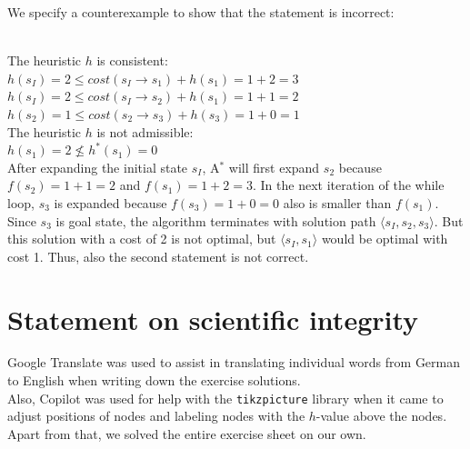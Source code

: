 \documentclass{article} %
\begin{document}
\begin{enumerate}[(a)]
    We specify a counterexample to show that the statement is incorrect:\\
    \\[0.7em]
    The heuristic $h$ is consistent:\\
    $h(s_I) = 2 \leq cost(s_I \rightarrow s_1) + h(s_1) = 1 + 2 = 3$\\
    $h(s_I) = 2 \leq cost(s_I \rightarrow s_2) + h(s_1) = 1 + 1 = 2$\\
    $h(s_2) = 1 \leq cost(s_2 \rightarrow s_3) + h(s_3) = 1 + 0 = 1$\\[0.5em]
    The heuristic $h$ is not admissible:\\
    $h(s_1) = 2 \not \leq h^*(s_1) = 0$\\[0.5em]
    After expanding the initial state $s_I$, A$^*$ will first expand $s_2$ because
    $f(s_2) = 1 + 1 = 2$ and $f(s_1) = 1 + 2 = 3$. In the next iteration of the
    while loop, $s_3$ is expanded because $f(s_3) = 1 + 0 = 0$ also is smaller
    than $f(s_1)$. Since $s_3$ is goal state, the algorithm terminates with solution
    path $\langle s_I, s_2, s_3 \rangle$. But this solution with a cost of 2 is not
    optimal, but $\langle s_I, s_1 \rangle$ would be optimal with cost 1. Thus,
    also the second statement is not correct.
\end{enumerate}

\section*{Statement on scientific integrity}
Google Translate was used to assist in translating individual words from
German to English when writing down the exercise solutions.\\
Also, Copilot was used for help with the \texttt{tikzpicture} library when
it came to adjust positions of nodes and labeling nodes with the $h$-value
above the nodes.
Apart from that, we solved the entire exercise sheet on our own.
\end{document}
